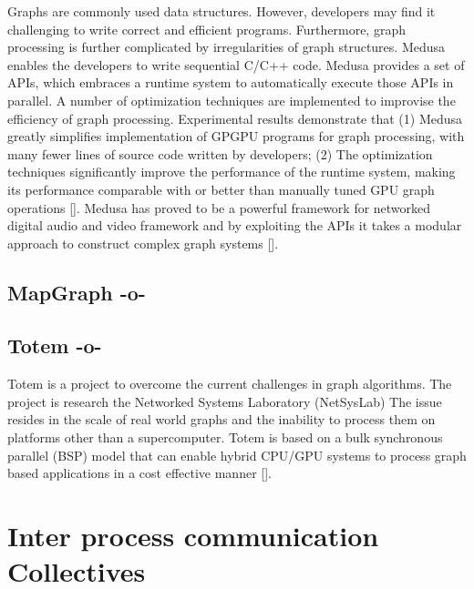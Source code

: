 Graphs are commonly used data structures. However, developers may find
it challenging to write correct and efficient programs. Furthermore,
graph processing is further complicated by irregularities of graph
structures. Medusa enables the developers to write sequential C/C++
code. Medusa provides a set of APIs, which embraces a runtime system
to automatically execute those APIs in parallel\cite{paper_medusa}.  A
number of optimization techniques are implemented to improvise the
efficiency of graph processing. Experimental results demonstrate that
(1) Medusa greatly simplifies implementation of GPGPU programs for
graph processing, with many fewer lines of source code written by
developers; (2) The optimization techniques significantly improve the
performance of the runtime system, making its performance comparable
with or better than manually tuned GPU graph
operations [\cite{paper_medusa}]. Medusa has proved to be a powerful
framework for networked digital audio and video framework and by
exploiting the APIs it takes a modular approach to construct complex
graph systems [\cite{www-medusa}].



\subsection{MapGraph -o-}



\subsection{Totem -o-}

Totem is a project to overcome the current challenges in graph
algorithms.  The project is research the Networked Systems Laboratory
(NetSysLab) The issue resides in the scale of real world graphs and
the inability to process them on platforms other than a supercomputer.
Totem is based on a bulk synchronous parallel (BSP) model that can
enable hybrid CPU/GPU systems to process graph based applications in a
cost effective manner [\cite{www-netsyslab}].




\section{Inter process communication Collectives}


